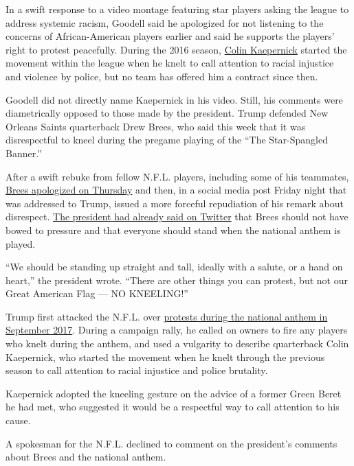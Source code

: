 In a swift response to a video montage featuring star players asking the
league to address systemic racism, Goodell said he apologized for not
listening to the concerns of African-American players earlier and said
he supports the players' right to protest peacefully. During the 2016
season,
\href{https://www.nytimes3xbfgragh.onion/2020/06/12/sports/football/nfl-protest-colin-kaepernick-activism.html}{Colin
Kaepernick} started the movement within the league when he knelt to call
attention to racial injustice and violence by police, but no team has
offered him a contract since then.

Goodell did not directly name Kaepernick in his video. Still, his
comments were diametrically opposed to those made by the president.
Trump defended New Orleans Saints quarterback Drew Brees, who said this
week that it was disrespectful to kneel during the pregame playing of
the ``The Star-Spangled Banner.''

After a swift rebuke from fellow N.F.L. players, including some of his
teammates,
\href{https://www.nytimes3xbfgragh.onion/2020/06/04/sports/football/drew-brees-apology-comments.html}{Brees
apologized on Thursday} and then, in a social media post Friday night
that was addressed to Trump, issued a more forceful repudiation of his
remark about disrespect.
\href{https://www.instagram.com/p/CBE4y_9Hj2S/?igshid=7ejunv7ktpcn}{The
president had already said on Twitter} that Brees should not have bowed
to pressure and that everyone should stand when the national anthem is
played.

``We should be standing up straight and tall, ideally with a salute, or
a hand on heart,'' the president wrote. ``There are other things you can
protest, but not our Great American Flag --- NO KNEELING!''

Trump first attacked the N.F.L. over
\href{https://www.nytimes3xbfgragh.onion/2017/09/23/sports/football/trump-nfl-kaepernick.html}{protests
during the national anthem in September 2017}. During a campaign rally,
he called on owners to fire any players who knelt during the anthem, and
used a vulgarity to describe quarterback Colin Kaepernick, who started
the movement when he knelt through the previous season to call attention
to racial injustice and police brutality.

Kaepernick adopted the kneeling gesture on the advice of a former Green
Beret he had met, who suggested it would be a respectful way to call
attention to his cause.

A spokesman for the N.F.L. declined to comment on the president's
comments about Brees and the national anthem.

